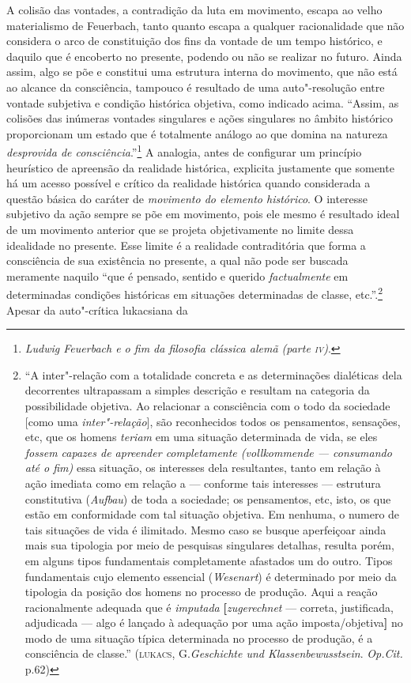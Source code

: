 A colisão das vontades, a contradição da luta em movimento, escapa ao
velho materialismo de Feuerbach, tanto quanto escapa a qualquer
racionalidade que não considera o arco de constituição dos fins da
vontade de um tempo histórico, e daquilo que é encoberto no presente,
podendo ou não se realizar no futuro. Ainda assim, algo se põe e
constitui uma estrutura interna do movimento, que não está ao alcance da
consciência, tampouco é resultado de uma auto"-resolução entre vontade
subjetiva e condição histórica objetiva, como indicado acima. ``Assim,
as colisões das inúmeras vontades singulares e ações singulares no
âmbito histórico proporcionam um estado que é totalmente análogo ao que
domina na natureza \emph{desprovida de consciência}.''\footnote{\emph{Ludwig
  Feuerbach e o fim da filosofia clássica alemã (parte \textsc{iv})}.} A
analogia, antes de configurar um princípio heurístico de apreensão da
realidade histórica, explicita justamente que somente há um acesso
possível e crítico da realidade histórica quando considerada a questão
básica do caráter de \emph{movimento do elemento histórico}. O interesse
subjetivo da ação sempre se põe em movimento, pois ele mesmo é resultado
ideal de um movimento anterior que se projeta objetivamente no limite
dessa idealidade no presente. Esse limite é a realidade contraditória
que forma a consciência de sua existência no presente, a qual não pode
ser buscada meramente naquilo ``que é pensado, sentido e querido
\emph{factualmente} em determinadas condições históricas em situações
determinadas de classe, etc.''.\footnote{``A inter"-relação com a
  totalidade concreta e as determinações dialéticas dela decorrentes
  ultrapassam a simples descrição e resultam na categoria da
  possibilidade objetiva. Ao relacionar a consciência com o todo da
  sociedade {[}como uma \emph{inter"-relação}{]}, são reconhecidos todos
  os pensamentos, sensações, etc, que os homens \emph{teriam} em uma
  situação determinada de vida, se eles \emph{fossem capazes de
  apreender completamente (vollkommende --- consumando até o fim)} essa
  situação, os interesses dela resultantes, tanto em relação à ação
  imediata como em relação a --- conforme tais interesses --- estrutura
  constitutiva (\emph{Aufbau}) de toda a sociedade; os pensamentos, etc,
  isto, os que estão em conformidade com tal situação objetiva. Em
  nenhuma, o numero de tais situações de vida é ilimitado. Mesmo caso se
  busque aperfeiçoar ainda mais sua tipologia por meio de pesquisas
  singulares detalhas, resulta porém, em alguns tipos fundamentais
  completamente afastados um do outro. Tipos fundamentais cujo elemento
  essencial (\emph{Wesenart}) é determinado por meio da tipologia da
  posição dos homens no processo de produção. Aqui a reação
  racionalmente adequada que é \emph{imputada}
  \textbf{{[}}\emph{zugerechnet} --- correta, justificada, adjudicada
  --- algo é lançado à adequação por uma ação
  imposta/objetiva\textbf{{]}} no modo de uma situação típica
  determinada no processo de produção, é a consciência de classe.''
  (\textsc{lukacs}, G.\emph{Geschichte und Klassenbewusstsein}.
  \emph{Op.Cit.} p.62)} Apesar da auto"-crítica lukacsiana da
